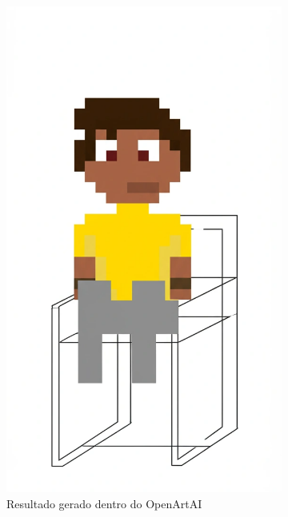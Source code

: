 \begin{figure}[htbp]
    \centering
    \caption{\small Imagens geradas pelo modelo Gemini}
    \label{fig:openArtComparaGemini}
    \begin{subfigure}{0.32\linewidth}
    \centering
        \includegraphics[width=1\linewidth]{figs/OpenArtAI/gemini.png}
        \caption{\small Resultado gerado dentro do OpenArtAI}
        \label{fig:openArtComparaGemini1}
    \end{subfigure}
    \begin{subfigure}{0.32\linewidth}

\end{subfigure}
\end{figure}

